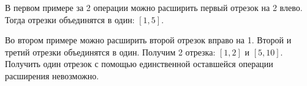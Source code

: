В первом примере за 2 операции можно расширить первый отрезок на 2 влево. Тогда отрезки объединятся в один: $[1,5]$.

Во втором примере можно расширить второй отрезок вправо на 1. Второй и третий отрезки объединятся в один. Получим 2 отрезка: $[1,2]$ и $[5,10]$. Получить один отрезок с помощью единственной оставшейся операции расширения невозможно.